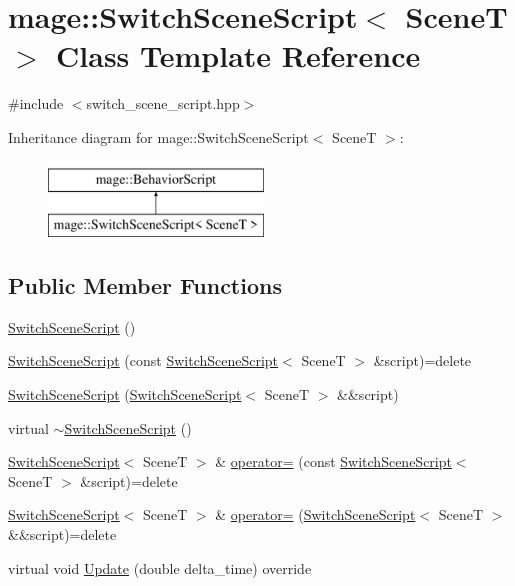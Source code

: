 \hypertarget{classmage_1_1_switch_scene_script}{}\section{mage\+:\+:Switch\+Scene\+Script$<$ SceneT $>$ Class Template Reference}
\label{classmage_1_1_switch_scene_script}


{\ttfamily \#include $<$switch\+\_\+scene\+\_\+script.\+hpp$>$}

Inheritance diagram for mage\+:\+:Switch\+Scene\+Script$<$ SceneT $>$\+:\begin{figure}[H]
\begin{center}
\leavevmode
\includegraphics[height=2.000000cm]{classmage_1_1_switch_scene_script}
\end{center}
\end{figure}
\subsection*{Public Member Functions}
\begin{DoxyCompactItemize}
\item 
\hyperlink{classmage_1_1_switch_scene_script_aefd104d1ddabdd4709c8682e89c79655}{Switch\+Scene\+Script} ()
\item 
\hyperlink{classmage_1_1_switch_scene_script_a307db08624888173ab256b387f07f1c4}{Switch\+Scene\+Script} (const \hyperlink{classmage_1_1_switch_scene_script}{Switch\+Scene\+Script}$<$ SceneT $>$ \&script)=delete
\item 
\hyperlink{classmage_1_1_switch_scene_script_a6803282c82656616ac7459b34e85fdc7}{Switch\+Scene\+Script} (\hyperlink{classmage_1_1_switch_scene_script}{Switch\+Scene\+Script}$<$ SceneT $>$ \&\&script)
\item 
virtual \hyperlink{classmage_1_1_switch_scene_script_a9c5907dfea7512a934e37136a9e3970b}{$\sim$\+Switch\+Scene\+Script} ()
\item 
\hyperlink{classmage_1_1_switch_scene_script}{Switch\+Scene\+Script}$<$ SceneT $>$ \& \hyperlink{classmage_1_1_switch_scene_script_afa17a58d641d05ac406fecb43c84ec2b}{operator=} (const \hyperlink{classmage_1_1_switch_scene_script}{Switch\+Scene\+Script}$<$ SceneT $>$ \&script)=delete
\item 
\hyperlink{classmage_1_1_switch_scene_script}{Switch\+Scene\+Script}$<$ SceneT $>$ \& \hyperlink{classmage_1_1_switch_scene_script_a9f78862b9432a35e9bd606e0be43966a}{operator=} (\hyperlink{classmage_1_1_switch_scene_script}{Switch\+Scene\+Script}$<$ SceneT $>$ \&\&script)=delete
\item 
virtual void \hyperlink{classmage_1_1_switch_scene_script_a8faac4e2f6f571f13aecf488057f7dfb}{Update} (double delta\+\_\+time) override
\end{DoxyCompactItemize}
